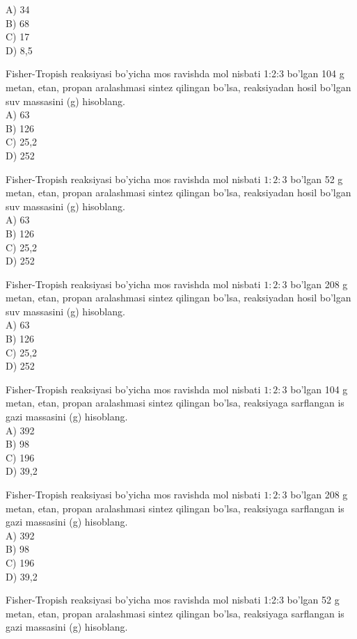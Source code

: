 A) 34\\
B) 68\\
C) 17\\
D) 8,5
  \item Fisher-Tropish reaksiyasi bo'yicha mos ravishda mol nisbati 1:2:3 bo'lgan 104 g metan, etan, propan aralashmasi sintez qilingan bo'lsa, reaksiyadan hosil bo'lgan suv massasini (g) hisoblang.\\
A) 63\\
B) 126\\
C) 25,2\\
D) 252
  \item Fisher-Tropish reaksiyasi bo'yicha mos ravishda mol nisbati $1: 2: 3$ bo'lgan 52 g metan, etan, propan aralashmasi sintez qilingan bo'lsa, reaksiyadan hosil bo'lgan suv massasini (g) hisoblang.\\
A) 63\\
B) 126\\
C) 25,2\\
D) 252
  \item Fisher-Tropish reaksiyasi bo'yicha mos ravishda mol nisbati $1: 2: 3$ bo'lgan 208 g metan, etan, propan aralashmasi sintez qilingan bo'lsa, reaksiyadan hosil bo'lgan suv massasini (g) hisoblang.\\
A) 63\\
B) 126\\
C) 25,2\\
D) 252
  \item Fisher-Tropish reaksiyasi bo'yicha mos ravishda mol nisbati $1: 2: 3$ bo'lgan 104 g metan, etan, propan aralashmasi sintez qilingan bo'lsa, reaksiyaga sarflangan is gazi massasini (g) hisoblang.\\
A) 392\\
B) 98\\
C) 196\\
D) 39,2
  \item Fisher-Tropish reaksiyasi bo'yicha mos ravishda mol nisbati $1: 2: 3$ bo'lgan 208 g metan, etan, propan aralashmasi sintez qilingan bo'lsa, reaksiyaga sarflangan is gazi massasini (g) hisoblang.\\
A) 392\\
B) 98\\
C) 196\\
D) 39,2
  \item Fisher-Tropish reaksiyasi bo'yicha mos ravishda mol nisbati 1:2:3 bo'lgan 52 g metan, etan, propan aralashmasi sintez qilingan bo'lsa, reaksiyaga sarflangan is gazi massasini (g) hisoblang.\\
